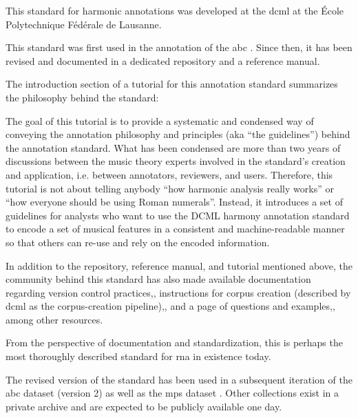 

This standard for harmonic annotations was developed at the
\gls{dcml} at the \'Ecole Polytechnique F\'ed\'erale de
Lausanne.

This standard was first used in the annotation of the
\gls{abc}
\parencite{neuwirth2018annotated}. Since then, it has been
revised and documented in a dedicated
repository
and a reference
manual.

The introduction section of a tutorial for this annotation
standard summarizes the philosophy behind the
standard:

\begin{italicsquote}
    The goal of this tutorial is to provide a systematic and
    condensed way of conveying the annotation philosophy and
    principles (aka ``the guidelines'') behind the
    annotation standard. What has been condensed are more
    than two years of discussions between the music theory
    experts involved in the standard's creation and
    application, i.e. between annotators, reviewers, and
    users. Therefore, this tutorial is not about telling
    anybody ``how harmonic analysis really works'' or ``how
    everyone should be using Roman numerals''. Instead, it
    introduces a set of guidelines for analysts who want to
    use the DCML harmony annotation standard to encode a set
    of musical features in a consistent and machine-readable
    manner so that others can re-use and rely on the encoded
    information.
\end{italicsquote}

In addition to the repository, reference manual, and
tutorial mentioned above, the community behind this standard
has also made available documentation regarding version
control
practices,,
instructions for corpus creation (described by \gls{dcml} as
the corpus-creation
pipeline),,
and a page of questions and
examples,,
among other resources.

From the perspective of documentation and standardization,
this is perhaps the most thoroughly described standard for
\gls{rna} in existence today.

The revised version of the standard has been used in a
subsequent iteration of the \gls{abc} dataset (version 2) as
well as the \gls{mps} dataset
\parencite{hentschel2021annotated}. Other collections exist
in a private archive and are expected to be publicly
available one day.
